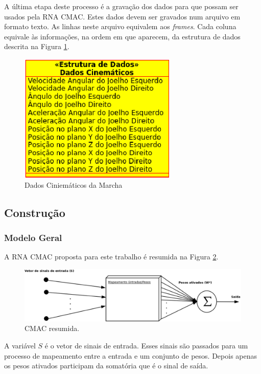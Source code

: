 A última etapa deste processo é a gravação dos dados para que possam ser usados pela RNA CMAC. 
Estes dados devem ser gravados num arquivo em formato texto. 
As linhas neste arquivo equivalem aos \emph{frames}. 
Cada coluna equivale às informações, na ordem em que aparecem, da estrutura de dados descrita na Figura \ref{dados_cinematicos}. 
\begin{figure}[ht]
	\centering
	\includegraphics[width=7.5cm]{figuras/dados_cinematicos.eps}
	\caption{Dados Ciniemáticos da Marcha}
	\label{dados_cinematicos}
\end{figure}

\subsection[Construção de uma RNA CMAC]{\textbf{Construção}}
\subsubsection{Modelo Geral}

A RNA CMAC proposta para este trabalho é resumida na Figura \ref{camac_resumida}.

\begin{figure}[ht]
	\centering
	\includegraphics[width=15cm]{figuras/cmac_resumida.eps}
	\caption{CMAC resumida.}
	\label{camac_resumida}
\end{figure}

A variável $S$ é o vetor de sinais de entrada. 
Esses sinais são passados para um processo de mapeamento entre a entrada e um conjunto de pesos. 
Depois apenas os pesos ativados participam da somatória que é o sinal de saída. 

